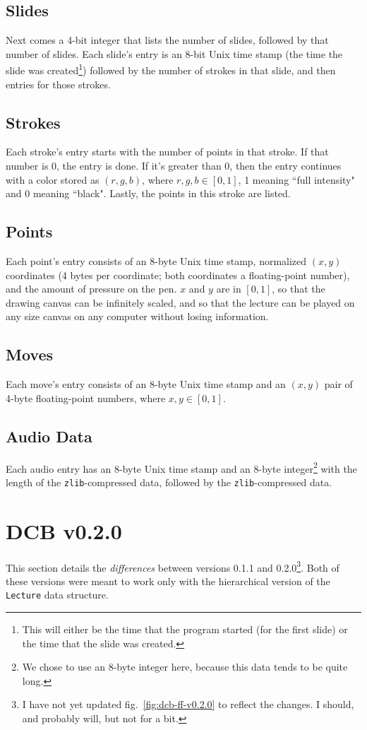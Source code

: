 \subsection{Slides}
Next comes a 4-bit integer that lists the number of slides, followed by that number of slides.  Each slide's entry is an 8-bit Unix time stamp (the time the slide was created\footnote{This will either be the time that the program started (for the first slide) or the time that the slide was created.}) followed by the number of strokes in that slide, and then entries for those strokes.

\subsection{Strokes}
Each stroke's entry starts with the number of points in that stroke.  If that number is 0, the entry is done.  If it's greater than 0, then the entry continues with a color stored as $(r,g,b)$, where $r,g,b\in[0,1]$, 1 meaning ``full intensity" and 0 meaning ``black".  Lastly, the points in this stroke are listed.

\subsection{Points}
Each point's entry consists of an 8-byte Unix time stamp, normalized $(x,y)$ coordinates (4 bytes per coordinate; both coordinates a floating-point number), and the amount of pressure on the pen.  $x$ and $y$ are in $[0,1]$, so that the drawing canvas can be infinitely scaled, and so that the lecture can be played on any size canvas on any computer without losing information.

\subsection{Moves}
Each move's entry consists of an 8-byte Unix time stamp and an $(x,y)$ pair of 4-byte floating-point numbers, where $x,y\in[0,1]$.

\subsection{Audio Data}
Each audio entry has an 8-byte Unix time stamp and an 8-byte integer\footnote{We chose to use an 8-byte integer here, because this data tends to be quite long.} with the length of the {\tt zlib}-compressed data, followed by the {\tt zlib}-compressed data.

\section{DCB v0.2.0}
This section details the \emph{differences} between versions 0.1.1 and 0.2.0\footnote{I have not yet updated fig.~\ref{fig:dcb-ff-v0.2.0} to reflect the changes.  I should, and probably will, but not for a bit.}.  Both of these versions were meant to work only with the hierarchical version of the {\tt Lecture} data structure.

